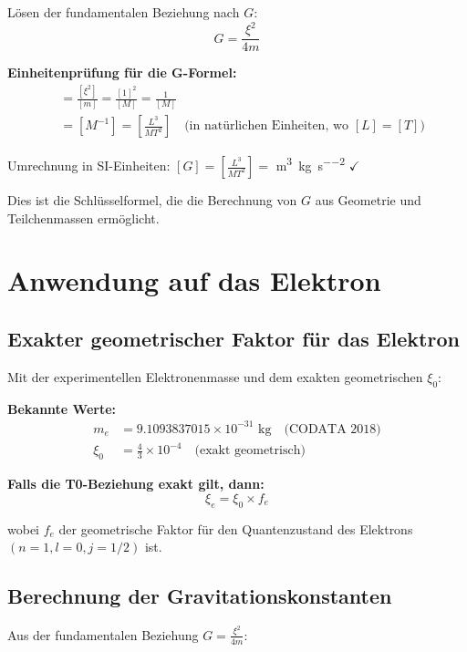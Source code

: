 \documentclass[12pt,a4paper]{article}
\theoremstyle{definition}
\begin{document}
	Lösen der fundamentalen Beziehung nach $G$:
	\begin{equation}
		\boxed{G = \frac{\xi^2}{4m}}
	\end{equation}
	
	\textbf{Einheitenprüfung für die G-Formel:}
	\begin{align}
		[G] &= \frac{[\xi^2]}{[m]} = \frac{[1]^2}{[M]} = \frac{1}{[M]} \\
		&= [M^{-1}] = \left[\frac{L^3}{MT^2}\right] \quad \text{(in natürlichen Einheiten, wo } [L]=[T] \text{)}
	\end{align}
	
	Umrechnung in SI-Einheiten: $[G] = \left[\frac{L^3}{MT^2}\right] = $ \si{\metre\cubed\per\kilogram\per\second\squared} $\checkmark$
	
	Dies ist die Schlüsselformel, die die Berechnung von $G$ aus Geometrie und Teilchenmassen ermöglicht.
	
	\section{Anwendung auf das Elektron}
	
	\subsection{Exakter geometrischer Faktor für das Elektron}
	
	Mit der experimentellen Elektronenmasse und dem exakten geometrischen $\xi_0$:
	
	\textbf{Bekannte Werte:}
	\begin{align}
		m_e &= 9.1093837015 \times 10^{-31} \text{ kg} \quad \text{(CODATA 2018)}\\
		\xi_0 &= \frac{4}{3} \times 10^{-4} \quad \text{(exakt geometrisch)}
	\end{align}
	
	\textbf{Falls die T0-Beziehung exakt gilt, dann:}
	\begin{equation}
		\xi_e = \xi_0 \times f_e
	\end{equation}
	
	wobei $f_e$ der geometrische Faktor für den Quantenzustand des Elektrons $(n=1, l=0, j=1/2)$ ist.
	
	\subsection{Berechnung der Gravitationskonstanten}
	
	Aus der fundamentalen Beziehung $G = \frac{\xi^2}{4m}$:
	
\end{document}

